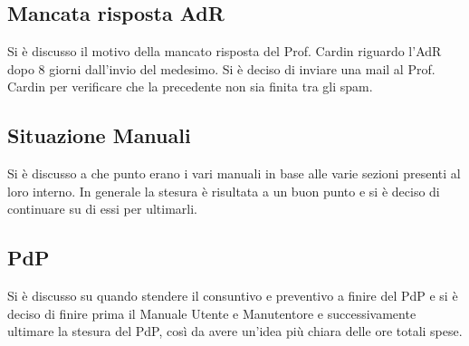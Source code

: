 \subsection*{Mancata risposta AdR}
Si è discusso il motivo della mancato risposta del Prof. Cardin riguardo l'AdR dopo 8 giorni dall'invio del medesimo.
Si è deciso di inviare una mail al Prof. Cardin per verificare che la precedente non sia finita tra gli spam.
\subsection*{Situazione Manuali}
Si è discusso a che punto erano i vari manuali in base alle varie sezioni presenti al loro interno. In generale la stesura è risultata a un buon punto e si è deciso di continuare su di essi per ultimarli.
\subsection*{PdP}
 Si è discusso su quando stendere il consuntivo e preventivo a finire del PdP e si è deciso di finire prima il Manuale Utente e Manutentore e successivamente ultimare la stesura del PdP, così da avere un'idea più chiara delle ore totali spese.

